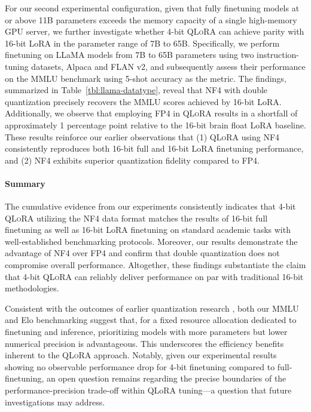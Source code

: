 For our second experimental configuration, given that fully finetuning models at or above 11B parameters exceeds the memory capacity of a single high-memory GPU server, we further investigate whether 4-bit \textsc{QLoRA} can achieve parity with 16-bit LoRA in the parameter range of 7B to 65B. Specifically, we perform finetuning on LLaMA models from 7B to 65B parameters using two instruction-tuning datasets, Alpaca and FLAN v2, and subsequently assess their performance on the MMLU benchmark using 5-shot accuracy as the metric. The findings, summarized in Table~\ref{tbl:llama-datatype}, reveal that NF4 with double quantization precisely recovers the MMLU scores achieved by 16-bit LoRA. Additionally, we observe that employing FP4 in \textsc{QLoRA} results in a shortfall of approximately 1 percentage point relative to the 16-bit brain float LoRA baseline. These results reinforce our earlier observations that (1) \textsc{QLoRA} using NF4 consistently reproduces both 16-bit full and 16-bit LoRA finetuning performance, and (2) NF4 exhibits superior quantization fidelity compared to FP4.

\paragraph{Summary} The cumulative evidence from our experiments consistently indicates that 4-bit \textsc{QLoRA} utilizing the NF4 data format matches the results of 16-bit full finetuning as well as 16-bit LoRA finetuning on standard academic tasks with well-established benchmarking protocols. Moreover, our results demonstrate the advantage of NF4 over FP4 and confirm that double quantization does not compromise overall performance. Altogether, these findings substantiate the claim that 4-bit \textsc{QLoRA} can reliably deliver performance on par with traditional 16-bit methodologies.

Consistent with the outcomes of earlier quantization research \citep{dettmers2022case}, both our MMLU and Elo benchmarking suggest that, for a fixed resource allocation dedicated to finetuning and inference, prioritizing models with more parameters but lower numerical precision is advantageous. This underscores the efficiency benefits inherent to the \textsc{QLoRA} approach. Notably, given our experimental results showing no observable performance drop for 4-bit finetuning compared to full-finetuning, an open question remains regarding the precise boundaries of the performance-precision trade-off within QLoRA tuning—a question that future investigations may address.

